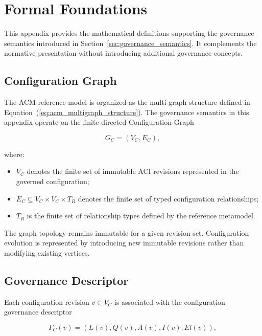 \documentclass[10pt]{article}
\begin{document}
\section{Formal Foundations}
\label{appendix:formal_foundations}

This appendix provides the mathematical definitions supporting the governance semantics introduced in Section~\ref{sec:governance_semantics}. It complements the normative presentation without introducing additional governance concepts.

\subsection{Configuration Graph}
The ACM reference model is organized as the multi-graph structure defined in Equation~(\ref{eq:acm_multigraph_structure}). The governance semantics in this appendix operate on the finite directed Configuration Graph

\begin{equation}
	G_C=(V_C,E_C),
	\label{eq:graph_definition}
\end{equation}

where:

\begin{itemize}
	\item $V_C$ denotes the finite set of immutable ACI revisions represented in the governed configuration;
	\item $E_C\subseteq V_C\times V_C\times T_R$ denotes the finite set of typed configuration relationships;
	\item $T_R$ is the finite set of relationship types defined by the reference metamodel.
\end{itemize}
The graph topology remains immutable for a given revision set. Configuration evolution is represented by introducing new immutable revisions rather than modifying existing vertices.

\subsection{Governance Descriptor}

Each configuration revision $v\in V_C$ is associated with the
configuration governance descriptor

\begin{equation}
	\Gamma_C(v)=
	\left(
	L(v),
	Q(v),
	A(v),
	I(v),
	El(v)
	\right),
	\label{eq:descriptor_definition}
\end{equation}
\end{document}

